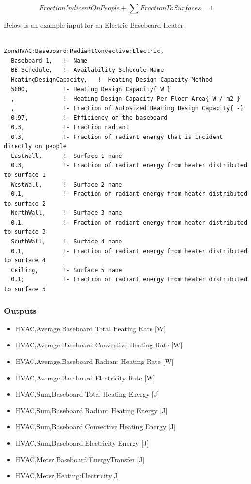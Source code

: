 \begin{equation}
FractionIndicentOnPeople + \sum {FractionToSurfaces = 1}
\end{equation}

Below is an example input for an Electric Baseboard Heater.

\begin{lstlisting}

ZoneHVAC:Baseboard:RadiantConvective:Electric,
  Baseboard 1,   !- Name
  BB Schedule,   !- Availability Schedule Name
  HeatingDesignCapacity,   !- Heating Design Capacity Method
  5000,          !- Heating Design Capacity{ W }
  ,              !- Heating Design Capacity Per Floor Area{ W / m2 }
  ,              !- Fraction of Autosized Heating Design Capacity{ -}
  0.97,          !- Efficiency of the baseboard
  0.3,           !- Fraction radiant
  0.3,           !- Fraction of radiant energy that is incident directly on people
  EastWall,      !- Surface 1 name
  0.3,           !- Fraction of radiant energy from heater distributed to surface 1
  WestWall,      !- Surface 2 name
  0.1,           !- Fraction of radiant energy from heater distributed to surface 2
  NorthWall,     !- Surface 3 name
  0.1,           !- Fraction of radiant energy from heater distributed to surface 3
  SouthWall,     !- Surface 4 name
  0.1,           !- Fraction of radiant energy from heater distributed to surface 4
  Ceiling,       !- Surface 5 name
  0.1;           !- Fraction of radiant energy from heater distributed to surface 5
\end{lstlisting}

\subsubsection{Outputs}\label{outputs-2-017}

\begin{itemize}
\item
  HVAC,Average,Baseboard Total Heating Rate {[}W{]}
\item
  HVAC,Average,Baseboard Convective Heating Rate {[}W{]}
\item
  HVAC,Average,Baseboard Radiant Heating Rate {[}W{]}
\item
  HVAC,Average,Baseboard Electricity Rate {[}W{]}
\item
  HVAC,Sum,Baseboard Total Heating Energy {[}J{]}
\item
  HVAC,Sum,Baseboard Radiant Heating Energy {[}J{]}
\item
  HVAC,Sum,Baseboard Convective Heating Energy {[}J{]}
\item
  HVAC,Sum,Baseboard Electricity Energy {[}J{]}
\item
  HVAC,Meter,Baseboard:EnergyTransfer {[}J{]}
\item
  HVAC,Meter,Heating:Electricity{[}J{]}
\end{itemize}

